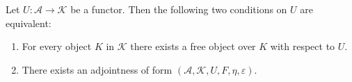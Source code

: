 Let $U: \mathcal{A} \longrightarrow \mathcal{K}$ be a functor. Then the following two conditions on $U$ are equivalent:

\begin{enumerate}
\item For every object $K$ in $\mathcal{K}$ there exists a free object over $K$ with respect to $U$.
\item There exists an adjointness of form $(\mathcal{A}, \mathcal{K}, U, F, \eta, \varepsilon)$.
\end{enumerate}
